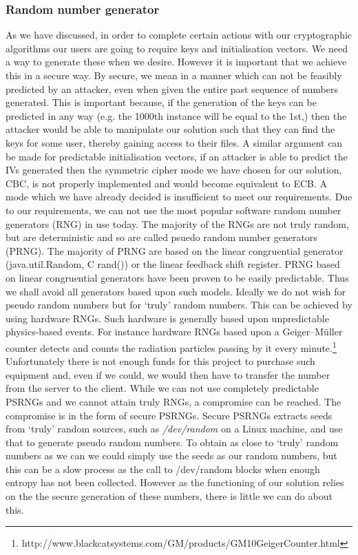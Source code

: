 \documentclass[12pt, titlepage]{article}
\begin{document}
\subsubsection{Random number generator}
As we have discussed, in order to complete certain actions with our cryptographic algorithms our users are going to require keys and initialisation vectors. We need a way to generate these when we desire. However it is important that we achieve this in a secure way. By secure, we mean in a manner which can not be feasibly predicted by an attacker, even when given the entire past sequence of numbers generated. This is important because, if the generation of the keys can be predicted in any way (e.g. the 1000th instance will be equal to the 1st,) then the attacker would be able to manipulate our solution such that they can find the keys for some user, thereby gaining access to their files. A similar argument can be made for predictable initialisation vectors, if an attacker is able to predict the IVs generated then the symmetric cipher mode we have chosen for our solution, CBC, is not properly implemented and would become equivalent to ECB. A mode which we have already decided is insufficient to meet our requirements.
\newline \indent Due to our requirements, we can not use the most popular software random number generators (RNG) in use today. The majority of the RNGs are not truly random, but are deterministic and so are called psuedo random number generators (PRNG). The majority of PRNG are based on the linear congruential generator (java.util.Random, C rand()) or the linear feedback shift register. PRNG based on linear congruential generators have been proven to be easily predictable.\cite{lcgPRNGPredictable} Thus we shall avoid all generators based upon such models.
\newline \indent Ideally we do not wish for pseudo random numbers but for `truly' random numbers. This can be achieved by using hardware RNGs. Such hardware is generally based upon unpredictable physics-based events. For instance hardware RNGs based upon a Geiger–Müller counter detects and counts the radiation particles passing by it every minute.\footnote{http://www.blackcatsystems.com/GM/products/GM10GeigerCounter.html} Unfortunately there is not enough funds for this project to purchase such equipment and, even if we could, we would then have to transfer the number from the server to the client.
\newline \indent While we can not use completely predictable PSRNGs and we cannot attain truly RNGs, a compromise can be reached. The compromise is in the form of secure PSRNGs. Secure PSRNGs extracts seeds from `truly' random sources, such as \textit{/dev/random} on a Linux machine, and use that to generate pseudo random numbers. To obtain as close to `truly' random numbers as we can we could simply use the seeds as our random numbers, but this can be a slow process as the call to /dev/random blocks when enough entropy has not been collected. However as the functioning of our solution relies on the the secure generation of these numbers, there is little we can do about this.
\end{document}
